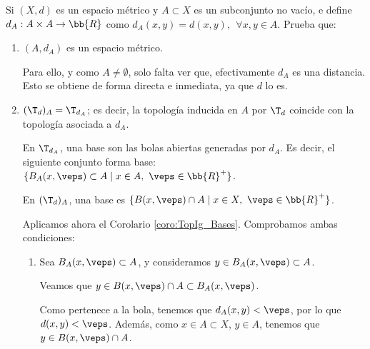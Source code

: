 \begin{ejercicio}
    Si $(X,d)$ es un espacio métrico y $A\subset X$ es un subconjunto no vacío, e define $d_A:A\times A\to \bb{R}$ como $d_A(x,y)=d(x,y),~~\forall x,y\in A$. Prueba que:
    \begin{enumerate}
        \item $(A,d_A)$ es un espacio métrico.

        Para ello, y como $A\neq \emptyset$, solo falta ver que, efectivamente $d_A$ es una distancia. Esto se obtiene de forma directa e inmediata, ya que $d$ lo es.
        
        \item $(\T_d)_A=\T_{d_A}$; es decir, la topología inducida en $A$ por $\T_d$ coincide con la topología asociada a $d_A$.

        En $\T_{d_A}$, una base son las bolas abiertas generadas por $d_A$. Es decir, el siguiente conjunto forma base: $\{B_A(x,\veps)\subset A\mid x\in A,~\veps\in\bb{R}^+\}$.

        En $(\T_d)_A$, una base es $\{B(x,\veps)\cap A\mid x\in X,~\veps\in\bb{R}^+\}$.

        Aplicamos ahora el Corolario \ref{coro:TopIg_Bases}. Comprobamos ambas condiciones:
        \begin{enumerate}
            \item Sea $B_A(x,\veps)\subset A$, y consideramos $y\in B_A(x,\veps)\subset A$.
            
            Veamos que $y\in B(x,\veps)\cap A\subset B_A(x,\veps)$. 
            
            
            
            Como pertenece a la bola, tenemos que $d_A(x,y)<\veps$, por lo que $d(x,y)<\veps$. Además, como $x\in A\subset X$, $y\in A$, tenemos que $y\in B(x,\veps)\cap A$.
        \end{enumerate}
    \end{enumerate}
\end{ejercicio}

